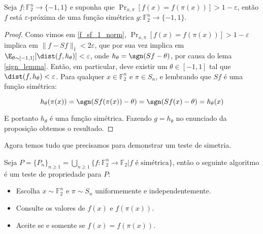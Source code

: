 \begin{prop} \label{close_to_symmetric}

Seja $f: \mathbb{F}_{2}^{n} \to \{-1, 1\}$ e suponha que $\Pr_{x, \pi}[f(x) = f(\pi(x))] > 1 - \varepsilon$, então $f$ está $\varepsilon$-próxima de uma função simétrica $g: \mathbb{F}_{2}^{n} \to \{-1, 1\}$.

\end{prop}

\begin{proof}

Como vimos em \ref{f_sf_1_norm}, $\Pr_{x, \pi}[f(x) = f(\pi(x))] > 1 - \varepsilon$ implica em $\lVert f - Sf \rVert_{1} < 2\varepsilon$, que por sua vez implica em $\E_{\theta \sim [-1, 1]}[\dist(f, h_{\theta})] < \varepsilon$, onde $h_{\theta} = \sgn(Sf - \theta)$, por causa do lema \ref{sign_lemma}. Então, em particular, deve existir um $\theta \in [-1, 1]$ tal que $\dist(f, h_{\theta}) < \varepsilon$. Para qualquer $x \in \mathbb{F}_{2}^{n}$ e $\pi \in S_{n}$, e lembrando que $Sf$ é uma função simétrica:

\begin{equation*}
	h_{\theta}(\pi(x)) = \sgn(Sf(\pi(x)) - \theta) = \sgn(Sf(x) - \theta) = h_{\theta}(x)
\end{equation*}

E portanto $h_{\theta}$ é uma função simétrica. Fazendo $g = h_{\theta}$ no enunciado da proposição obtemos o resultado.

\end{proof}

Agora temos tudo que precisamos para demonstrar um teste de simetria.

\begin{teo}

Seja $P = \{P_{n}\}_{n \geq 1} = \bigcup_{n \geq 1}\{ f: \mathbb{F}_{2}^{n} \to \mathbb{F}_{2} \lvert f \text{ é simétrica} \}$, então o seguinte algoritmo é um teste de propriedade para $P$:

\begin{itemize}

	\item Escolha $x \sim \mathbb{F}_{2}^{n}$ e $\pi \sim S_{n}$ uniformemente e independentemente.
	
	\item Consulte os valores de $f(x)$ e $f(\pi(x))$.
	
	\item Aceite se e somente se $f(x) = f(\pi(x))$.

\end{itemize}

\end{teo}

